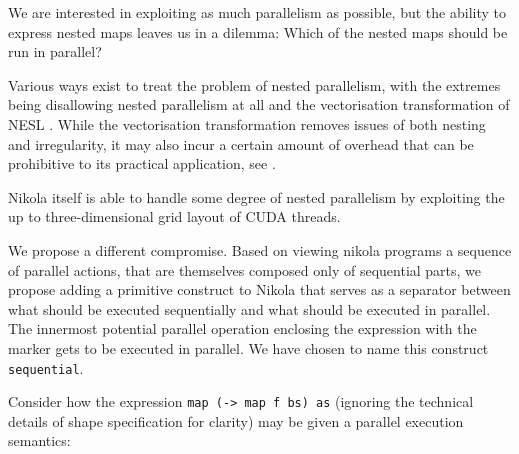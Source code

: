 \label{chap:directing-parallelism}









We are interested in exploiting as much parallelism as possible, but the
ability to express nested maps leaves us in a dilemma: Which of the nested maps
should be run in parallel?

Various ways exist to treat the problem of nested parallelism, with the
extremes being disallowing nested parallelism at all and the vectorisation
transformation of NESL \cite{nesl}. While the vectorisation transformation
removes issues of both nesting and irregularity, it may also incur a certain
amount of overhead that can be prohibitive to its practical application, see
\cite{Catanzaro2011}.

Nikola itself is able to handle some degree of nested parallelism by exploiting
the up to three-dimensional grid layout of CUDA threads.

We propose a different compromise. Based on viewing nikola programs a sequence
of parallel actions, that are themselves composed only of sequential parts, we
propose adding a primitive construct to Nikola that serves as a separator
between what should be executed sequentially and what should be executed in
parallel. The innermost potential parallel operation enclosing the expression
with the marker gets to be executed in parallel. We have chosen to name this
construct \texttt{sequential}.

Consider how the expression \texttt{map (\bs -> map f bs) as} (ignoring the
technical details of shape specification for clarity) may be given a parallel
execution semantics:

